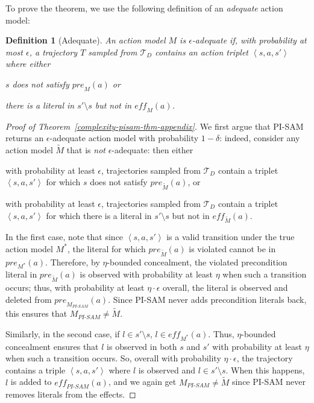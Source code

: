 \documentclass[letterpaper]{article} %
\newcommand{\tuple}[1]{\ensuremath{\left \langle #1 \right \rangle }}
\newcommand{\pre}{\textit{pre}}
\newcommand{\eff}{\textit{eff}}
\newcommand{\pisam}{\textit{PI-SAM}\xspace}
\newtheorem{definition}{Definition}
\begin{document}
To prove the theorem, we use the following definition of an {\em adequate} action model:
\begin{definition}[Adequate]
An action model $M$ is {\em $\epsilon$-adequate} if, with probability at most $\epsilon$, a trajectory $T$ sampled from $\mathcal{T}_D$ contains an action triplet $\tuple{s,a,s'}$ where either
\begin{compactenum}
\item $s$ does not satisfy $\pre_M(a)$ or
\item there is a literal in $s'\setminus s$ but not in $\eff_M(a)$.
\end{compactenum}
\end{definition}

\begin{proof}[Proof of Theorem~\ref{complexity-pisam-thm-appendix}]
We first argue that PI-SAM returns an $\epsilon$-adequate action model with probability $1-\delta$: indeed, consider any action model $\tilde{M}$ that is {\em not} $\epsilon$-adequate: then either
\begin{compactenum}
\item with probability at least $\epsilon$, trajectories sampled from $\mathcal{T}_D$ contain a triplet $\tuple{s,a,s'}$ for which $s$ does not satisfy $\pre_{\tilde{M}}(a)$, or
\item with probability at least $\epsilon$, trajectories sampled from $\mathcal{T}_D$ contain a triplet $\tuple{s,a,s'}$ for which there is a literal in $s'\setminus s$ but not in $\eff_{\tilde{M}}(a)$.
\end{compactenum}
In the first case, note that since $\tuple{s,a,s'}$ is a valid transition under the true action model $M^*$, the literal for which $\pre_{\tilde{M}}(a)$ is violated cannot be in $\pre_{M^*}(a)$. Therefore, by $\eta$-bounded concealment, the violated precondition literal in $\pre_{\tilde{M}}(a)$ is observed with probability at least $\eta$ when such a transition occurs; thus, with probability at least $\eta\cdot\epsilon$ overall, the literal is observed and deleted from $\pre_{M_{\pisam}}(a)$. Since PI-SAM never adds precondition literals back, this ensures that $M_{\pisam}\neq \tilde{M}$.

Similarly, in the second case, if $l\in s'\setminus s$, $l\in\eff_{M^*}(a)$. Thus, $\eta$-bounded concealment ensures that $l$ is observed in both $s$ and $s'$ with probability at least $\eta$ when such a transition occurs. So, overall with probability $\eta\cdot\epsilon$, the trajectory contains a triple $\tuple{s,a,s'}$ where $l$ is observed and $l\in s'\setminus s$. When this happens, $l$ is added to $\eff_{\pisam}(a)$, and we again get $M_\pisam\neq \tilde{M}$ since PI-SAM never removes literals from the effects.


\end{proof}
\end{document}
